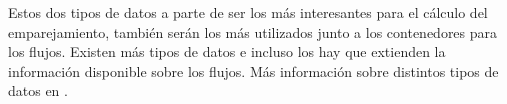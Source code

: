 \intro Estos dos tipos de datos a parte de ser los más interesantes para el cálculo del emparejamiento, también 
serán los más utilizados junto a los contenedores para los flujos. Existen más tipos de datos e incluso los hay que 
extienden la información disponible sobre los flujos. Más información sobre distintos tipos de datos en \cite{conntype}.
